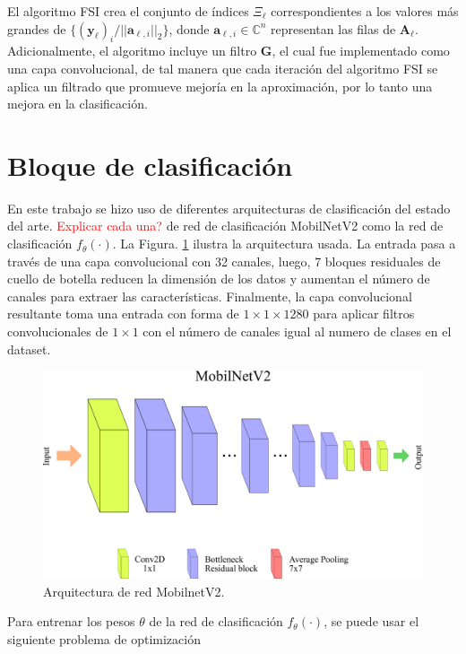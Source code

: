 El algoritmo FSI crea el conjunto de índices $\Xi_\ell$ correspondientes a los valores más grandes de $\{(\mathbf{y}_\ell)_{i}/\vert \vert\mathbf{a}_{\ell,i}\vert \vert_2\}$, donde $\mathbf{a}_{\ell,i}\in\mathbb{C}^{n}$ representan las filas de $\mathbf{A}_\ell$. Adicionalmente, el algoritmo incluye un filtro $\mathbf{G}$, el cual fue implementado como una capa convolucional, de tal manera que cada iteración del algoritmo FSI se aplica un filtrado que promueve mejoría en la aproximación, por lo tanto una mejora en la clasificación. 
\section{Bloque de clasificación}

En este trabajo se hizo uso de diferentes arquitecturas de clasificación del estado del arte. \textcolor{red}{Explicar cada una?} de red de clasificación MobilNetV2  como la red de clasificación $f_\theta(\cdot)$. La Figura. \ref{fig:mobilnetv2} ilustra la arquitectura usada. La entrada pasa a través de una capa convolucional con 32 canales, luego, 7 bloques residuales de cuello de botella reducen la dimensión de los datos y aumentan el número de canales para extraer las características. Finalmente, la capa convolucional resultante toma una entrada con forma de $1\times1\times1280$ para aplicar filtros convolucionales de $1\times1$ con el número de canales igual al numero de clases en el dataset.

\begin{figure}[!h]
    \centering
    \includegraphics[width=1\linewidth]{images/MobilNet.pdf}
    \caption{Arquitectura de red MobilnetV2.}
    \label{fig:mobilnetv2}
\end{figure}

Para entrenar los pesos $\theta$ de la red de clasificación $f_\theta(\cdot)$, se puede usar el siguiente problema de optimización

